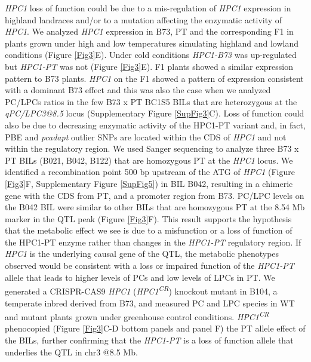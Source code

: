 \documentclass[9pt,twocolumn,twoside,lineno]{BioRxiv}
\begin{document}
\textit{HPC1} loss of function could be due to a mis-regulation of \textit{HPC1} expression in highland landraces and/or to a mutation affecting the enzymatic activity of \textit{HPC1}. 
We analyzed \textit{HPC1} expression in B73, PT and the corresponding F1 in plants grown under high and low temperatures simulating highland and lowland conditions (Figure \ref{Fig3}E). 
Under cold conditions \textit{HPC1-B73} was up-regulated but \textit{HPC1-PT} was not (Figure \ref{Fig3}E). 
F1 plants showed a similar expression pattern to B73 plants.
\textit{HPC1} on the F1 showed a pattern of expression consistent with a dominant B73 effect and this was also the case when we analyzed PC/LPCs ratios in the few B73 x PT BC1S5 BILs that are heterozygous at the \textit{qPC/LPC3@8.5} locus (Supplementary Figure \ref{SupFig3}C).
Loss of function could also be due to decreasing enzymatic activity of the HPC1-PT variant and, in fact, PBE and \textit{pcadapt} outlier SNPs are located within the CDS of \textit{HPC1} and not within the regulatory region. 
We used Sanger sequencing to analyze three B73 x PT BILs (B021, B042, B122) that are homozygous PT at the \textit{HPC1} locus.
We identified a recombination point 500 bp upstream of the ATG of \textit{HPC1} (Figure \ref{Fig3}F, Supplementary Figure \ref{SupFig5}) in BIL B042, resulting in a chimeric gene with the CDS from PT, and a promoter region from B73.
PC/LPC levels on the B042 BIL were similar to other BILs that are homozygous PT at the 8.54 Mb marker in the QTL peak (Figure \ref{Fig3}F). 
This result supports the hypothesis that the metabolic effect we see is due to a misfunction or a loss of function of the HPC1-PT enzyme rather than changes in the \textit{HPC1-PT} regulatory region.
If \textit{HPC1} is the underlying causal gene of the QTL, the metabolic phenotypes observed would be consistent with a loss or impaired function of the \textit{HPC1-PT} allele that leads to higher levels of PCs and low levels of LPCs in PT. 
We generated a CRISPR-CAS9 \textit{HPC1} (\textit{HPC1\textsuperscript{CR}}) knockout mutant in B104, a temperate inbred derived from B73, and measured PC and LPC species in WT and mutant plants grown under greenhouse control conditions. 
\textit{HPC1\textsuperscript{CR}} phenocopied (Figure \ref{Fig3}C-D bottom panels and panel F) the PT allele effect of the BILs, further confirming that the \textit{HPC1-PT} is a loss of function allele that underlies the QTL in chr3 @8.5 Mb. 
\end{document}
